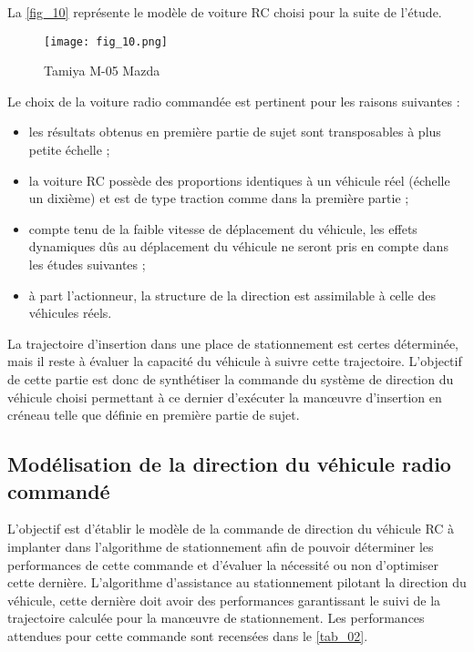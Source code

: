 La \autoref{fig_10} représente le modèle de voiture RC choisi pour la suite de l’étude.

\begin{figure}[H]
\centering
\texttt{[image: fig\_10.png]}
\caption{Tamiya M-05 Mazda \label{fig_10}}
\end{figure}

Le choix de la voiture radio commandée est pertinent pour les raisons suivantes :
\begin{itemize}
\item les résultats obtenus en première partie de sujet sont transposables à plus petite échelle ;
\item la voiture RC possède des proportions identiques à un véhicule réel (échelle un dixième) et est de type
traction comme dans la première partie ;
\item compte tenu de la faible vitesse de déplacement du véhicule, les effets dynamiques dûs au déplacement du
véhicule ne seront pris en compte dans les études suivantes ;
\item à part l’actionneur, la structure de la direction est assimilable à celle des véhicules réels.
\end{itemize}

\begin{obj}
La trajectoire d’insertion dans une place de stationnement est certes déterminée, mais il reste à évaluer
la capacité du véhicule à suivre cette trajectoire. L’objectif de cette partie est donc de synthétiser la
commande du système de direction du véhicule choisi permettant à ce dernier d’exécuter la manœuvre
d’insertion en créneau telle que définie en première partie de sujet.
\end{obj}

\subsection{Modélisation de la direction du véhicule radio commandé}

L’objectif est d’établir le modèle de la commande de direction du véhicule RC à implanter dans l’algorithme
de stationnement afin de pouvoir déterminer les performances de cette commande et d’évaluer la nécessité ou
non d’optimiser cette dernière. L’algorithme d’assistance au stationnement pilotant la direction du véhicule,
cette dernière doit avoir des performances garantissant le suivi de la trajectoire calculée pour la manœuvre de
stationnement.
Les performances attendues pour cette commande sont recensées dans le \autoref{tab_02}.

